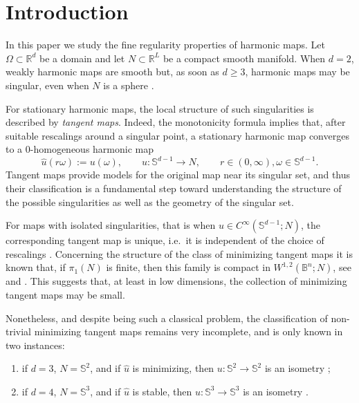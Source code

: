 \documentclass[11pt]{article}
\theoremstyle{plain}
\numberwithin{equation}{section}
\theoremstyle{definition}
\def \mb{\mathbb}
\begin{document}
    \vspace{1cm}

    
\section{Introduction}
In this paper we study the fine regularity properties of harmonic maps. Let $\Omega\subset \mathbb{R}^d$ be a domain and let $N\subset \mathbb{R}^L$ be a compact smooth manifold. When $d=2$, weakly harmonic maps are smooth \cite{Helein2002} but, as soon as $d\geq 3$, harmonic maps may be singular, even when $N$ is a sphere \cite{Lin2008}. 

For  stationary harmonic maps, the local structure of such singularities is described by \textit{tangent maps}. Indeed, the monotonicity formula implies that, after suitable rescalings around a singular point, a stationary harmonic map converges to a 0-homogeneous harmonic map
$$\hat u(r \omega):= u(\omega), \qquad   u\colon \mb S^{d-1}\to N, \qquad r\in (0,\infty), \omega\in \mb S^{d-1}.$$
Tangent maps provide models for the original map near its singular set, and thus their classification is a fundamental step toward understanding the structure of the possible singularities as well as the geometry of the singular set.

For maps with isolated singularities, that is when $u\in C^\infty(\mb S^{d-1};N)$, the corresponding tangent map is unique, i.e.\ it is independent of the choice of rescalings \cite{Simon1983}. Concerning the structure of the class of minimizing tangent maps  it is known that, if $\pi_1(N)$ is finite, then this family is compact in $W^{1,2}(\mb B^n;N)$, see \cite[Theorem 5.7]{Mazowiecka2018} and \cite[Theorem 6.4]{Hardt1987a}. This suggests that, at least in low dimensions, the collection of minimizing tangent maps may be small.

Nonetheless,  and despite being such a classical problem, the classification of non-trivial minimizing tangent maps remains very incomplete, and is only known in two instances:
\begin{enumerate}
\item\label{it:BCL} if $d=3$, $N=\mb S^2$, and if $\hat u$ is minimizing,  then $u\colon \mb S^2\to \mb S^2$ is an isometry \cite{Brezis1986};
\item \label{it:Naka} if $d=4$, $N=\mb S^3$, and if $\hat u$ is stable, then $u\colon \mb S^3\to \mb S^3$ is an isometry \cite{Nakajima2006}. 
\end{enumerate}
\end{document}
